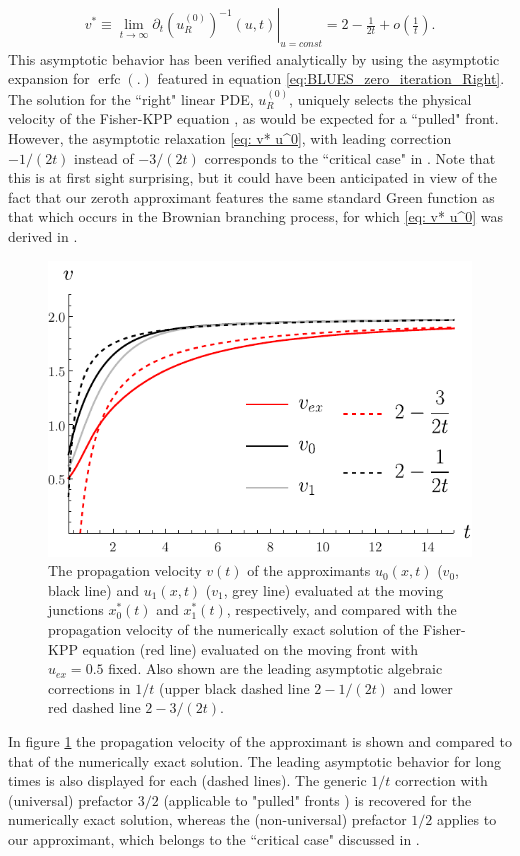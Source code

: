\documentclass[amsmath,amssymb,amsfonts,aps,pre,preprint,superscriptaddress,showpacs,showkeys,longbibliography,nofootinbib]{revtex4-1}
\DeclareMathOperator{\erfc}{erfc}
\begin{document}
\begin{align}\label{eq: v* u^0}
  v^*\equiv \left.\lim_{t\to\infty}\partial_t (u^{(0)}_{R})^{-1}(u,t)\right|_{u=const} =2 -\frac{1}{2t} + o\left(\frac{1}{t}\right).
\end{align}
This asymptotic behavior has been verified analytically by using the asymptotic expansion \cite{abramowitz+stegun} for $\erfc(.)$ featured in equation \eqref{eq:BLUES_zero_iteration_Right}. The solution for the ``right" linear PDE, $u^{(0)}_{R}$, uniquely selects the physical velocity of the Fisher-KPP equation \cite{brunet2016}, as would be expected for a ``pulled" front. However, the asymptotic relaxation \eqref{eq: v* u^0}, with leading correction $-1/(2t)$ instead of $-3/(2t)$ corresponds to the ``critical case" in \citet{Berestycki2017}. Note that this is at first sight surprising, but it could have been anticipated in view of the fact that our zeroth approximant features the same standard Green function as that which occurs in the Brownian branching process, for which \eqref{eq: v* u^0} was derived in \cite{brunet2016}.
\begin{figure}[t]
    \centering
    \includegraphics[width=0.6\linewidth]{Figures/Velocity1.pdf}
    \caption{The propagation velocity $v(t)$ of the approximants $u_0(x,t)$ ($v_0$, black line) and $u_1(x,t)$ ($v_1$, grey line) evaluated at the moving junctions $x_0^*(t)$ and $x_1^*(t)$, respectively, and compared with the propagation velocity of the numerically exact solution of the Fisher-KPP equation (red line) evaluated on the moving front with $u_{ex} = 0.5$ fixed. Also shown are the leading asymptotic algebraic corrections in $1/t$ (upper black dashed line $2-1/(2t)$ and lower red dashed line $2-3/(2t)$. }
    \label{fig:Velocity}
\end{figure}

In figure \ref{fig:Velocity} the propagation velocity of the approximant is shown and compared to that of the numerically exact solution. The leading asymptotic behavior for long times is also displayed for each (dashed lines). The generic $1/t$ correction with (universal) prefactor $3/2$ (applicable to "pulled" fronts \cite{VANSAARLOOS200329, brunet2016}) is recovered for the numerically exact solution, whereas the (non-universal) prefactor $1/2$ applies to our approximant, which belongs to the ``critical case" discussed in \cite{Berestycki2017}.
\end{document}
